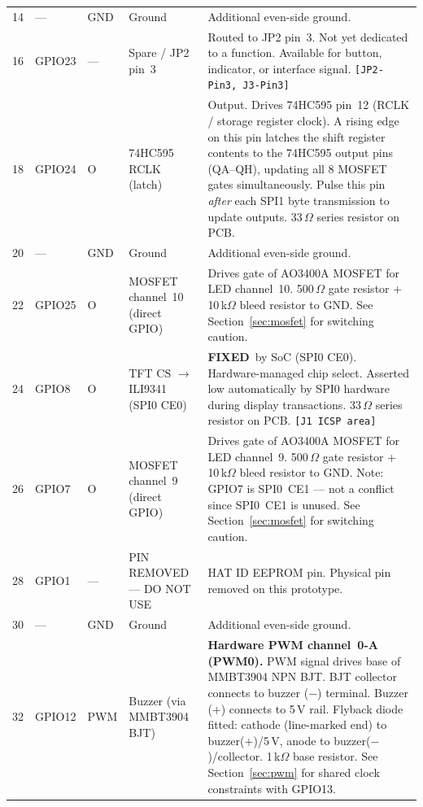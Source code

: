\documentclass[11pt,a4paper]{article}
\newcommand{\fixed}{\textbf{FIXED}}
\newcommand{\na}{---}
\newcommand{\jref}[1]{\texttt{\small[#1]}}
\begin{document}
\begin{longtable}{C{0.85cm} C{1.2cm} C{0.65cm} L{3.2cm} L{8.1cm}}
  14 & \na & GND & Ground &
    Additional even-side ground. \\

  16 & GPIO23 & \na & Spare / JP2 pin~3 &
    Routed to JP2 pin~3. Not yet dedicated to a function.
    Available for button, indicator, or interface signal.
    \jref{JP2-Pin3, J3-Pin3} \\

  18 & GPIO24 & O & 74HC595 RCLK (latch) &
    Output. Drives 74HC595 pin~12 (RCLK / storage register clock).
    A rising edge on this pin latches the shift register contents
    to the 74HC595 output pins (QA--QH), updating all 8 MOSFET gates
    simultaneously.
    Pulse this pin \emph{after} each SPI1 byte transmission to update outputs.
    33\,$\Omega$ series resistor on PCB. \\

  20 & \na & GND & Ground &
    Additional even-side ground. \\

  22 & GPIO25 & O & MOSFET channel~10 (direct GPIO) &
    Drives gate of AO3400A MOSFET for LED channel~10.
    500\,$\Omega$ gate resistor + 10\,k$\Omega$ bleed resistor to GND.
    See Section~\ref{sec:mosfet} for switching caution. \\

  24 & GPIO8 & O & TFT CS $\to$ ILI9341 (SPI0 CE0) &
    \fixed\ by SoC (SPI0 CE0). Hardware-managed chip select.
    Asserted low automatically by SPI0 hardware during display transactions.
    33\,$\Omega$ series resistor on PCB.
    \jref{J1 ICSP area} \\

  26 & GPIO7 & O & MOSFET channel~9 (direct GPIO) &
    Drives gate of AO3400A MOSFET for LED channel~9.
    500\,$\Omega$ gate resistor + 10\,k$\Omega$ bleed resistor to GND.
    Note: GPIO7 is SPI0~CE1 --- not a conflict since SPI0~CE1 is unused.
    See Section~\ref{sec:mosfet} for switching caution. \\

  28 & GPIO1 & \na & PIN REMOVED --- DO NOT USE &
    HAT ID EEPROM pin. Physical pin removed on this prototype. \\

  30 & \na & GND & Ground &
    Additional even-side ground. \\

  32 & GPIO12 & PWM & Buzzer (via MMBT3904 BJT) &
    \textbf{Hardware PWM channel~0-A (PWM0).}
    PWM signal drives base of MMBT3904 NPN BJT.
    BJT collector connects to buzzer ($-$) terminal.
    Buzzer ($+$) connects to 5\,V rail.
    Flyback diode fitted: cathode (line-marked end) to buzzer($+$)/5\,V,
    anode to buzzer($-$)/collector.
    1\,k$\Omega$ base resistor.
    See Section~\ref{sec:pwm} for shared clock constraints with GPIO13. \\


\end{longtable}
\end{document}
